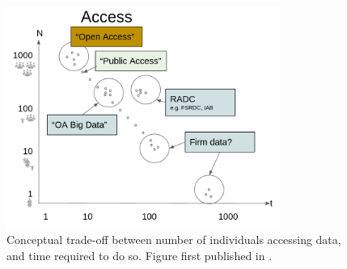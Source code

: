 
\begin{figure}
    \centering
    \includegraphics[width=0.8\textwidth]{figure1.png}
    \caption{Conceptual trade-off between number of individuals accessing data, and time required to do so. Figure first published in \citet{vilhuber_reproducibility_2023}.}
    \label{fig:nxt}
\end{figure}
